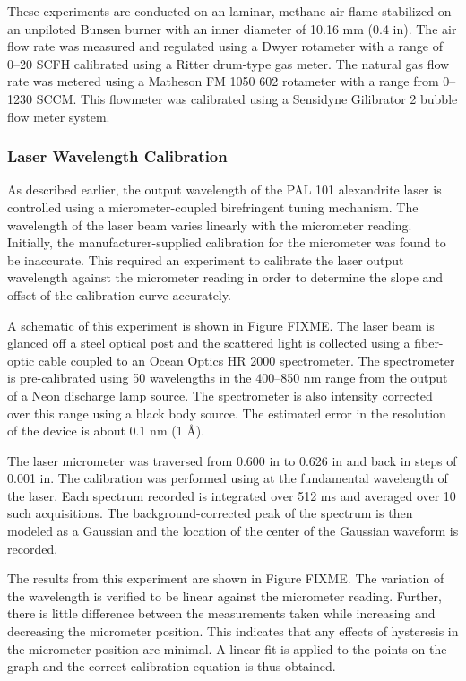 These experiments are conducted on an laminar, methane-air flame stabilized on an unpiloted Bunsen burner with an inner diameter of 10.16 mm (0.4 in).
The air flow rate was measured and regulated using a Dwyer rotameter with a range of 0--20 SCFH calibrated using a Ritter drum-type gas meter.
The natural gas flow rate was metered using a Matheson FM 1050 602 rotameter with a range from 0--1230 SCCM.
This flowmeter was calibrated using a Sensidyne Gilibrator 2 bubble flow meter system.

\subsubsection{Laser Wavelength Calibration}

As described earlier, the output wavelength of the PAL 101 alexandrite laser is controlled using a micrometer-coupled birefringent tuning mechanism.
The wavelength of the laser beam varies linearly with the micrometer reading.
Initially, the manufacturer-supplied calibration for the micrometer was found to be inaccurate.
This required an experiment to calibrate the laser output wavelength against the micrometer reading in order to determine the slope and offset of the calibration curve accurately.

A schematic of this experiment is shown in Figure FIXME.
The laser beam is glanced off a steel optical post and the scattered light is collected using a fiber-optic cable coupled to an Ocean Optics HR 2000 spectrometer.
The spectrometer is pre-calibrated using 50 wavelengths in the 400--850 nm range from the output of a Neon discharge lamp source.
The spectrometer is also intensity corrected over this range using a black body source.
The estimated error in the resolution of the device is about 0.1 nm (1 \AA).

The laser micrometer was traversed from 0.600 in to 0.626 in and back in steps of 0.001 in.
The calibration was performed using at the fundamental wavelength of the laser.
Each spectrum recorded is integrated over 512 ms and averaged over 10 such acquisitions.
The background-corrected peak of the spectrum is then modeled as a Gaussian and the location of the center of the Gaussian waveform is recorded.

The results from this experiment are shown in Figure FIXME.
The variation of the wavelength is verified to be linear against the micrometer reading.
Further, there is little difference between the measurements taken while increasing and decreasing the micrometer position.
This indicates that any effects of hysteresis in the micrometer position are minimal.
A linear fit is applied to the points on the graph and the correct calibration equation is thus obtained.

